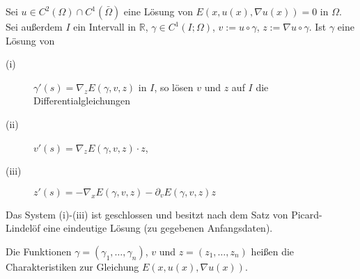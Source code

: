 \begin{satz}
	Sei $u \in C^2(\Omega) \cap C^1(\bar{\Omega})$ eine Lösung von $E(x,u(x), \nabla u(x))= 0 $ in $\Omega$. Sei außerdem $I$ ein Intervall in $\mathbb{R}$, 
	$\gamma \in C^1(I;\Omega)$, $v:= u \circ \gamma$, $z:=  \nabla u \circ \gamma$. Ist $\gamma$ eine Lösung von 
	\begin{description}
		\item[(i)] $\gamma'(s) =  \nabla _z E(\gamma,v,z)$ in $I$, so lösen $v$ und $z$ auf $I$ die Differentialgleichungen
		\item[(ii)] $v'(s)=  \nabla_z E(\gamma,v,z) \cdot z$,
		\item[(iii)] $z'(s) = -  \nabla_x E(\gamma,v,z) - \partial_v E(\gamma,v,z)z$
	\end{description}
\end{satz}
\begin{bemerkung}
	Das System (i)-(iii) ist geschlossen und besitzt nach dem Satz von Picard-Lindelöf eine eindeutige Lösung (zu gegebenen Anfangsdaten).
\end{bemerkung}
\begin{definition*}
	Die Funktionen $\gamma = (\gamma_1, \dots, \gamma_n)$, $v$ und $z = (z_1, \dots, z_n)$ heißen die Charakteristiken zur Gleichung $E(x,u(x), \nabla u(x))$.
\end{definition*}

